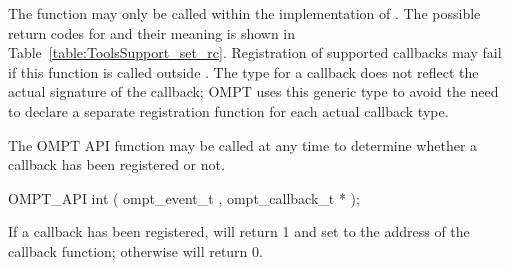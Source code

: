 \noindent
The  function  may only be called within the implementation of .
The possible return codes for  and their meaning is shown in Table~\ref{table:ToolsSupport_set_rc}.
Registration of supported callbacks may fail if this function is called outside  .
The  type for a callback does not reflect the actual signature of the callback; OMPT uses this generic type to avoid the need to declare a separate registration function for each actual callback type.

The OMPT API function  may be called at any time to determine whether a callback has been registered or not. 

\begin{boxedcode}
OMPT\_API int (
  ompt\_event\_t ,
  ompt\_callback\_t *
);
\end{boxedcode}

\noindent
If a callback has been registered,  will return 1 and set  to the address of the callback function; otherwise  will return 0.

